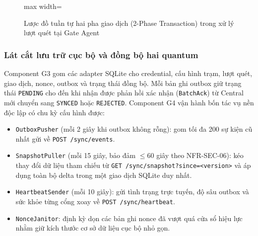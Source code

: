 \begin{figure}[H]
\begin{adjustbox}{max width=\textwidth}
\end{adjustbox}
\caption{Lược đồ tuần tự hai pha giao dịch (2-Phase Transaction) trong xử lý lượt quét tại Gate Agent}
\label{fig:seq-scan-2phase}
\end{figure}

\subsubsection{Lát cắt lưu trữ cục bộ và đồng bộ hai quantum}

Component G3 gom các adapter SQLite cho credential, cấu hình trạm, lượt quét, giao dịch, nonce,
outbox và trạng thái đồng bộ. Mỗi bản ghi outbox giữ trạng thái \texttt{PENDING} cho đến khi nhận
được phản hồi xác nhận (\texttt{BatchAck}) từ Central mới chuyển sang \texttt{SYNCED} hoặc
\texttt{REJECTED}. Component G4 vận hành bốn tác vụ nền độc lập có chu kỳ cấu hình được:
\begin{itemize}
    \item \texttt{OutboxPusher} (mỗi 2 giây khi outbox không rỗng): gom tối đa 200 sự kiện cũ nhất
    gửi về \texttt{POST /sync/events}.
    \item \texttt{SnapshotPuller} (mỗi 15 giây, bảo đảm $\leq 60$ giây theo NFR-SEC-06): kéo thay đổi
    dữ liệu tham chiếu từ \texttt{GET /sync/snapshot?since=<version>} và áp dụng toàn bộ delta trong
    một giao dịch SQLite duy nhất.
    \item \texttt{HeartbeatSender} (mỗi 10 giây): gửi tình trạng trực tuyến, độ sâu outbox và sức
    khỏe từng cổng xoay về \texttt{POST /sync/heartbeat}.
    \item \texttt{NonceJanitor}: định kỳ dọn các bản ghi nonce đã vượt quá cửa sổ hiệu lực nhằm giữ
    kích thước cơ sở dữ liệu cục bộ nhỏ gọn.
\end{itemize}


